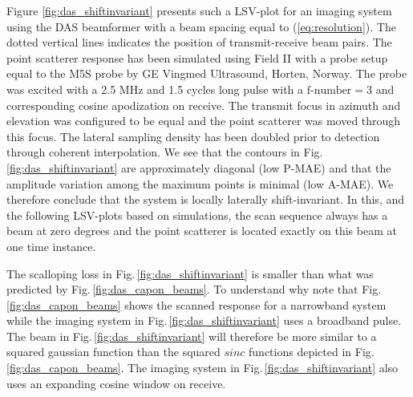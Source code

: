 \documentclass[journal]{IEEEtran}
\begin{document}
Figure \ref{fig:das_shiftinvariant} presents such a LSV-plot for an imaging system using the DAS beamformer with a beam spacing equal to (\ref{eq:resolution}). The dotted vertical lines indicates the position of transmit-receive beam pairs. The point scatterer response has been simulated using Field II \cite{Jensen1992, Jensen1996a} with a probe setup equal to the M5S probe by GE Vingmed Ultrasound, Horten, Norway. The probe was excited with a 2.5 MHz and 1.5 cycles long pulse with a $\text{f-number}=3$ and corresponding cosine apodization on receive. The transmit focus in azimuth and elevation was configured to be equal and the point scatterer was moved through this focus. The lateral sampling density has been doubled prior to detection through coherent interpolation. We see that the contours in Fig.\,\ref{fig:das_shiftinvariant} are approximately diagonal (low P-MAE) and that the amplitude variation among the maximum points is minimal (low A-MAE). We therefore conclude that the system is locally laterally shift-invariant. In this, and the following LSV-plots based on simulations, the scan sequence always has a beam at zero degrees and the point scatterer is located exactly on this beam at one time instance.

The scalloping loss in Fig.\,\ref{fig:das_shiftinvariant} is smaller than what was predicted by Fig.\,\ref{fig:das_capon_beams}. To understand why note that Fig.\,\ref{fig:das_capon_beams} shows the scanned response for a narrowband system while the imaging system in Fig.\,\ref{fig:das_shiftinvariant} uses a broadband pulse. The beam in Fig.\,\ref{fig:das_shiftinvariant} will therefore be more similar to a squared gaussian function than the squared $sinc$ functions depicted in Fig.\,\ref{fig:das_capon_beams}. The imaging system in Fig.\,\ref{fig:das_shiftinvariant} also uses an expanding cosine window on receive.

\end{document}
